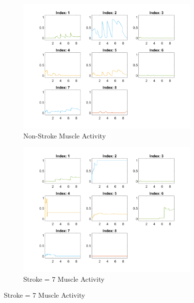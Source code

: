 \begin{figure}[ht]
    \centering
    \begin{subfigure}[b]{0.45\textwidth}
        \centering
        \includegraphics[width=\linewidth]{Pictures/Results/Controller/Healthy_NA.png}
        \caption{Non-Stroke Muscle Activity}
    \end{subfigure}%
    \hfill
    \begin{subfigure}[b]{0.45\textwidth}
        \centering
        \includegraphics[width=\linewidth]{Pictures/Results/Controller/StrokeWithouControl_NA.png}
        \caption{Stroke = 7 Muscle Activity}
    \end{subfigure}


\end{figure}

